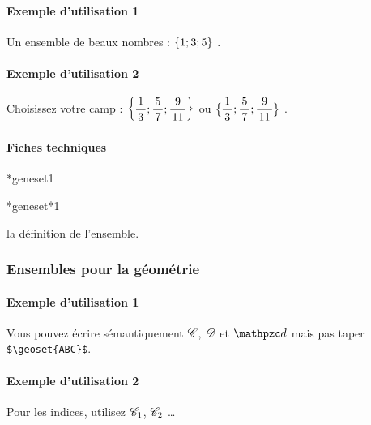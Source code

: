 \documentclass[12pt,a4paper]{article}
\makeatletter
\theoremstyle{definition}
\newcommand\IDmacro{\@ifstar{\@IDmacro@star}{\@IDmacro@no@star}}
\newcommand\@IDmacro@no@star[3]{%
    \texttt{%
    	\textbackslash#1%
    	\IfStrEq{#2}{0}{}{%
    		\,\,[#2 Option%
				\IfStrEq{#2}{1}{}{s}]%
			}%
	    \IfStrEq{#3}{}{}{%
	    		\,\,(#3 Argument%
				\IfStrEq{#3}{1}{}{s})%
			}
	   	}
    \immediate\write\tempfile{macro,#1,#2,#3}%
}
\newcommand\@IDmacro@star[2]{%
    \@IDmacro@no@star{#1}{0}{#2}%
}
\newcommand\@IDoptarg{\@ifstar{\@IDoptarg@star}{\@IDoptarg@no@star}}
\newcommand\@IDoptarg@star[2]{%
	\vspace{0.5em}
	\textbf{---} \texttt{#1%
		\IfStrEq{#2}{}{:}{\,#2:}%
	}%
}
\newcommand\@IDoptarg@no@star[2]{%
	\IfStrEq{#2}{}{%
		\@IDoptarg@star{#1}{}%
	}{%
		\@IDoptarg@star{#1}{#2}%
	}%
}
\newcommand\IDarg[1]{%
	\@IDoptarg{Argument}{#1}%
}
\makeatother
\begin{document}
            \paragraph{Exemple d'utilisation 1}

\begin{tcblisting}{}
Un ensemble de beaux nombres : $\geneset{1 ; 3 ; 5}$ .
\end{tcblisting}


            \paragraph{Exemple d'utilisation 2}

\begin{tcblisting}{}
Choisissez votre camp :
$\displaystyle \geneset{\frac{1}{3} ; \frac{5}{7} ; \frac{9}{11}}$
ou 
$\displaystyle \geneset*{\frac{1}{3} ; \frac{5}{7} ; \frac{9}{11}}$ .
\end{tcblisting}


            \paragraph{Fiches techniques}

\IDmacro*{geneset}{1}

\IDmacro*{geneset*}{1}

\IDarg{} la définition de l'ensemble.


        \subsubsection{Ensembles pour la géométrie}

            \paragraph{Exemple d'utilisation 1}

\begin{tcblisting}{}
Vous pouvez écrire sémantiquement $\geoset{C}$, $\geoset{D}$ et $\geoset{d}$ mais pas
taper \verb+$\geoset{ABC}$+.
\end{tcblisting}


            \paragraph{Exemple d'utilisation 2}

\begin{tcblisting}{}
Pour les indices, utilisez $\geoset*{C}{1}$, $\geoset*{C}{2}$ \dots
\end{tcblisting}
\end{document}
